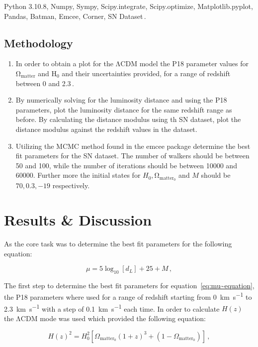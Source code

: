 \documentclass[12pt, a4paper]{article}
\begin{document}
        Python 3.10.8, Numpy, Sympy, Scipy.integrate, Scipy.optimize, Matplotlib.pyplot, Pandas, Batman, Emcee, Corner, SN Dataset\,.

    \subsection{Methodology}

        \begin{enumerate}
            \item In order to obtain a plot for the \(\mathrm{\Lambda}\)CDM model the P18 parameter values for \(\mathrm{\Omega}_{\mathrm{matter}}\) and H\(_0\) and their uncertainties provided, for a range of redshift between 0 and 2.3\,.
            \item By numerically solving for the luminosity distance and using the P18 parameters, plot the luminosity distance for the same redshift range as before. By calculating the distance modulus using th SN dataset, plot the distance modulus against the redshift values in the dataset.
            \item Utilizing the MCMC method found in the emcee package determine the best fit parameters for the SN dataset. The number of walkers should be between 50 and 100, while the number of iterations should be between 10000 and 60000. Further more the initial states for \(H_0, \mathrm{\Omega}_{\mathrm{matter_0}}\) and \(M\) should be \(70, 0.3, -19\) respectively.
        \end{enumerate}

\section{Results \& Discussion}

As the core task was to determine the best fit parameters for the following equation:

\begin{equation}
    \mu = 5\log_{10}[d_L]+25+M\,,
    \label{eq:mu~equation}
\end{equation}

The first step to determine the best fit parameters for equation~\ref{eq:mu~equation}, the P18 parameters where used for a range of redshift starting from \qty{0}{km.s^{-1}} to \qty{2.3}{km.s^{-1}} with a step of \qty{0.1}{km.s^{-1}} each time. In order to calculate \(H(z)\) the \(\mathrm{\Lambda}\)CDM mode was used which provided the following equation:

\begin{equation}
    H(z)^2 = H_0^2[\Omega_{\mathrm{matter_0}}(1+z)^3+(1-\Omega_{\mathrm{matter_0}})]\,,
    \label{eq:Hz~equation}
\end{equation}
\end{document}
